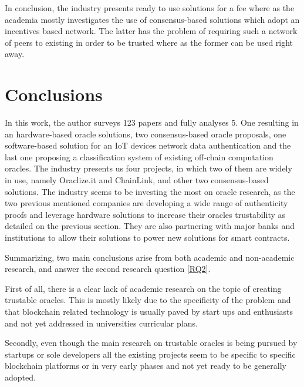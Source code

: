 \documentclass[final,3p,12pt,twocolumn]{elsarticle}
\begin{document}
In conclusion, the industry presents ready to use solutions for a fee where as the academia mostly investigates the use of consensus-based solutions which adopt an incentives based network. The latter has the problem of requiring such a network of peers to existing in order to be trusted where as the former can be used right away.



\section{Conclusions}\label{sec:6}

In this work, the author surveys 123 papers and fully analyses 5. One resulting in an hardware-based oracle solutions, two consensus-based oracle proposals, one software-based solution for an IoT devices network data authentication and the last one proposing a classification system of existing off-chain computation oracles. The industry presents us four projects, in which two of them are widely in use, namely Oraclize.it and ChainLink, and other two consensus-based solutions. The industry seems to be investing the most on oracle research, as the two previous mentioned companies are developing a wide range of authenticity proofs and leverage hardware solutions to increase their oracles trustability as detailed on the previous section. They are also partnering with major banks and institutions to allow their solutions to power new solutions for smart contracts.

Summarizing, two main conclusions arise from both academic and non-academic research, and answer the second research question \ref{RQ2}.

First of all, there is a clear lack of academic research on the topic of creating trustable oracles. This is mostly likely due to the specificity of the problem and that blockchain related technology is usually paved by start ups and enthusiasts and not yet addressed in universities curricular plans.

Secondly, even though the main research on trustable oracles is being pursued by startups or sole developers all the existing projects seem to be specific to specific blockchain platforms or in very early phases and not yet ready to be generally adopted.

\nolinenumbers

\end{document}
